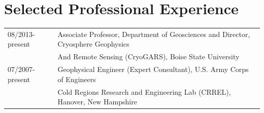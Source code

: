 \documentclass[11pt]{article}
\renewcommand\arraystretch{1}
\begin{document}
\section*{Selected Professional Experience}
\begin{tabular}{ll}
08/2013-present & Associate Professor, Department of Geosciences and Director, Cryosphere Geophysics \\
&  And Remote Sensing (CryoGARS), Boise State University \\
07/2007-present & Geophysical Engineer (Expert Consultant), U.S. Army Corps of Engineers \\
& Cold Regions Research and Engineering Lab (CRREL), Hanover, New Hampshire \\
\end{tabular}

%
%
\end{document}

